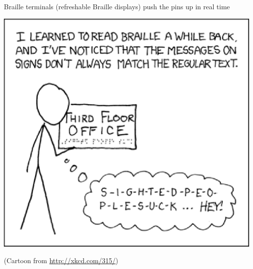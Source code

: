 \documentclass[a4paper,landscape,headrule,footrule,xetex]{foils}
\begin{document}
Braille terminals (refreshable Braille displays) push the pins up in
real time


\includegraphics{../pics/braille-xkcd.eps}

(Cartoon from \url{http://xkcd.com/315/})





\end{document}

